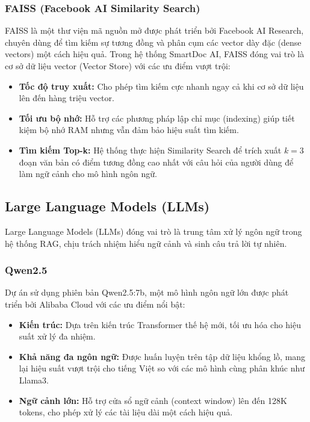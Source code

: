 \documentclass[conference]{IEEEtran}
\begin{document}
\subsubsection{FAISS (Facebook AI Similarity Search)}
FAISS là một thư viện mã nguồn mở được phát triển bởi Facebook AI Research, chuyên dùng để tìm kiếm sự tương đồng và phân cụm các vector dày đặc (dense vectors) một cách hiệu quả. Trong hệ thống SmartDoc AI, FAISS đóng vai trò là cơ sở dữ liệu vector (Vector Store) với các ưu điểm vượt trội:
\begin{itemize}
  \item \textbf{Tốc độ truy xuất:} Cho phép tìm kiếm cực nhanh ngay cả khi cơ sở dữ liệu lên đến hàng triệu vector.
  \item \textbf{Tối ưu bộ nhớ:} Hỗ trợ các phương pháp lập chỉ mục (indexing) giúp tiết kiệm bộ nhớ RAM nhưng vẫn đảm bảo hiệu suất tìm kiếm.
  \item \textbf{Tìm kiếm Top-k:} Hệ thống thực hiện Similarity Search để trích xuất $k = 3$ đoạn văn bản có điểm tương đồng cao nhất với câu hỏi của người dùng để làm ngữ cảnh cho mô hình ngôn ngữ.
\end{itemize}

\subsection{Large Language Models (LLMs)}

Large Language Models (LLMs) đóng vai trò là trung tâm xử lý ngôn ngữ trong hệ thống RAG, chịu trách nhiệm hiểu ngữ cảnh và sinh câu trả lời tự nhiên.

\subsubsection{Qwen2.5}
Dự án sử dụng phiên bản Qwen2.5:7b, một mô hình ngôn ngữ lớn được phát triển bởi Alibaba Cloud với các ưu điểm nổi bật:
\begin{itemize}
  \item \textbf{Kiến trúc:} Dựa trên kiến trúc Transformer thế hệ mới, tối ưu hóa cho hiệu suất xử lý đa nhiệm.
  \item \textbf{Khả năng đa ngôn ngữ:} Được huấn luyện trên tập dữ liệu khổng lồ, mang lại hiệu suất vượt trội cho tiếng Việt so với các mô hình cùng phân khúc như Llama3.
  \item \textbf{Ngữ cảnh lớn:} Hỗ trợ cửa sổ ngữ cảnh (context window) lên đến 128K tokens, cho phép xử lý các tài liệu dài một cách hiệu quả.
\end{itemize}
\end{document}
